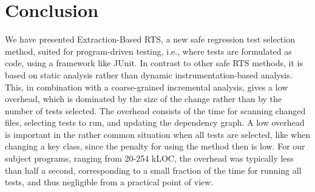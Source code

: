 {%




\section{Conclusion}
\label{Conclusion}

We have presented Extraction-Based RTS, a new safe regression test selection method, suited for program-driven testing, i.e., where tests are formulated as code, using a framework like JUnit. In contrast to other safe RTS methods, it is based on static analysis rather than dynamic in\-stru\-men\-ta\-tion-based analysis. This, in combination with a coarse-grained incremental analysis, gives a low overhead, which is dominated by the size of the change rather than by the number of tests selected. The overhead consists of the time for scanning changed files, selecting tests to run, and updating the dependency graph. A low overhead is important in the rather common situation when all tests are selected, like when changing a key class, since the penalty for using the method then is low. For our subject programs, ranging from 20-254 kLOC, the overhead was typically less than half a second, corresponding to a small fraction of the time for running all tests, and thus negligible from a practical point of view.


}
